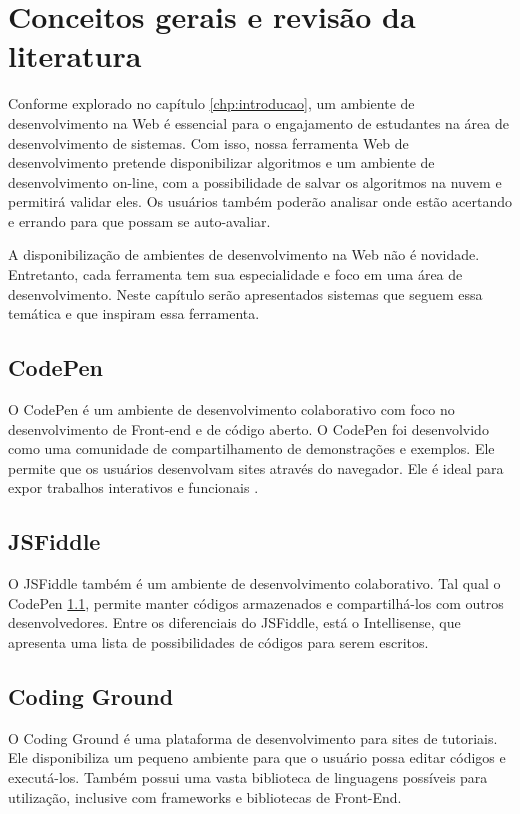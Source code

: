 \chapter{Conceitos gerais e revisão da literatura}
\label{chp:conceitos-gerais}
Conforme explorado no capítulo \ref{chp:introducao}, um ambiente de desenvolvimento na Web é essencial para o engajamento de estudantes na área de desenvolvimento de sistemas. Com isso, nossa ferramenta Web de desenvolvimento pretende disponibilizar algoritmos e um ambiente de desenvolvimento on-line, com a possibilidade de salvar os algoritmos na nuvem e permitirá validar eles. Os usuários também poderão analisar onde estão acertando e errando para que possam se auto-avaliar.

A disponibilização de ambientes de desenvolvimento na Web não é novidade. Entretanto, cada ferramenta tem sua especialidade e foco em uma área de desenvolvimento. Neste capítulo serão apresentados sistemas que seguem essa temática e que inspiram essa ferramenta.

\section{CodePen}
\label{sec:codepen}
O CodePen é um ambiente de desenvolvimento colaborativo com foco no desenvolvimento de Front-end e de código aberto. O CodePen foi desenvolvido como uma comunidade de compartilhamento de demonstrações e exemplos. Ele permite que os usuários desenvolvam sites através do navegador. Ele é ideal para expor trabalhos interativos e funcionais \cite{fiala2016collaborative}.

\section{JSFiddle}
\label{sec:jsfiddle}
O JSFiddle também é um ambiente de desenvolvimento colaborativo. Tal qual o CodePen \ref{sec:codepen}, permite manter códigos armazenados e compartilhá-los com outros desenvolvedores. Entre os diferenciais do JSFiddle, está o Intellisense, que apresenta uma lista de possibilidades de códigos para serem escritos.

\section{Coding Ground}
\label{sec:codingground}
O Coding Ground é uma plataforma de desenvolvimento para sites de tutoriais. Ele disponibiliza um pequeno ambiente para que o usuário possa editar códigos e executá-los. Também possui uma vasta biblioteca de linguagens possíveis para utilização, inclusive com frameworks e bibliotecas de Front-End.

